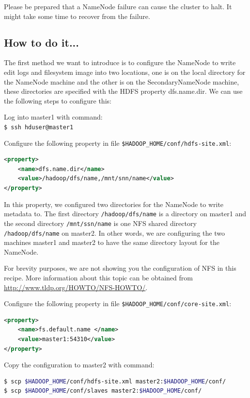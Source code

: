 Please be prepared that a NameNode failure can cause the cluster to halt. It might take some time to recover from the failure.
\subsection*{How to do it...}
The first method we want to introduce is to configure the NameNode to write edit logs and filesystem image into two locations, one is on the local directory for the NameNode machine and the other is on the SecondaryNameNode machine, these directories are specified with the HDFS property dfs.name.dir. We can use the following steps to configure this:

Log into master1 with command: \\
\verb|$ ssh hduser@master1|

Configure the following property in file \verb|$HADOOP_HOME/conf/hdfs-site.xml|:
\lstset{style=bashstyle}
\begin{lstlisting}[language=XML]
<property>
    <name>dfs.name.dir</name>
    <value>/hadoop/dfs/name,/mnt/snn/name</value>
</property>
\end{lstlisting}

In this property, we configured two directories for the NameNode to write metadata to. The first directory \verb|/hadoop/dfs/name| is a directory on master1 and the second directory \verb|/mnt/ssn/name| is one NFS shared directory \verb|/hadoop/dfs/name| on master2. In other words, we are configuring the two machines master1 and master2 to have the same directory layout for the NameNode.

For brevity purposes, we are not showing you the configuration of NFS in this recipe. More information about this topic can be obtained from \url{http://www.tldp.org/HOWTO/NFS-HOWTO/}.

Configure the following property in file \verb|$HADOOP_HOME/conf/core-site.xml|:
\lstset{style=bashstyle}
\begin{lstlisting}[language=XML]
<property>
    <name>fs.default.name </name>
    <value>master1:54310</value>
</property>
\end{lstlisting}

Copy the configuration to master2 with command:
\lstset{style=bashstyle}
\begin{lstlisting}[language=bash]
$ scp $HADOOP_HOME/conf/hdfs-site.xml master2:$HADOOP_HOME/conf/
$ scp $HADOOP_HOME/conf/slaves master2:$HADOOP_HOME/conf/
\end{lstlisting}

